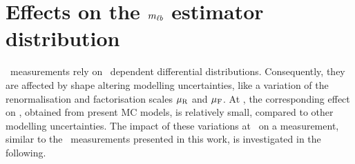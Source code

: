 \section[Effects on the \texorpdfstring{\mlb}{mlb} estimator distribution]{Effects on the \texorpdfstring{\boldmath$m_{\ell b}$}{mlb} estimator distribution}
%
\Tquark\ measurements rely on \mt\ dependent differential distributions. Consequently, they are affected by shape altering modelling uncertainties, like a variation of the renormalisation and factorisation scales $\mu_\mathrm{R}$ and $\mu_\mathrm{F}$. 
%
At \recolevel, the corresponding effect on \mt, obtained from present \gls{MC} models, is relatively small, compared to other modelling uncertainties. The impact of these variations at \genlevel\ on a measurement, similar to the \dil\ measurements presented in this work, is investigated in the following.

